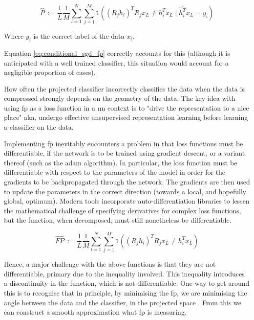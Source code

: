 \begin{equation}
\label{eq:conditional_sgd_fp}
\hat{P}\ := \frac{1}{L}\frac{1}{M}\sum_{l = 1}^N \sum_{j = 1}^M  \mathds{1}( (R_j h_i)^T R_jx_L \neq h_i^Tx_L \mid \hat{h_i^T}x_L = y_i )  
\end{equation}

Where $y_i$ is the correct label of the data $x_i$. 
\bigskip

Equation \ref{eq:conditional_sgd_fp} correctly accounts for this (although it is anticipated with a well trained classifier, this situation would account for a negligible proportion of cases). 
\bigskip

How often the projected classifier incorrectly classifies the data when the data is compressed strongly depends on the geometry of the data. The key idea with using \gls{fp} as a loss function in a \gls{nn} context is to "drive the representation to a nice place" aka, undergo effective unsupervised representation learning before learning a classifier on the data. 
\bigskip


Implementing  \gls{fp} inevitably encounters a problem in that loss functions must be differentiable, if the network is to be trained using gradient descent, or a variant thereof (such as the \gls{adam} algorithm). In particular, the loss function must be differentiable with respect to the parameters of the model in order for the gradients to be backpropagated through the network. The gradients are then used to update the parameters in the correct direction (towards a local, and hopefully global, optimum). Modern tools incorporate auto-differentiation libraries to lessen the mathematical challenge of specifying derivatives for complex loss functions, but the function, when decomposed, must still nonetheless be differentiable.
\bigskip

\begin{equation}
\hat{FP}\ := \frac{1}{L}\frac{1}{M}\sum_{l = 1}^N \sum_{j = 1}^M \mathds{1}((R_j h_i)^T R_jx_L \neq h_i^Tx_L)  
\label{eq:sgd_fp}
\end{equation}

Hence, a major challenge with the above functions is that they are not differentiable, primary due to the inequality involved. This inequality introduces a discontinuity in the function, which is not differentiable. One way to get around this is to recognise that in principle, by minimising the \gls{fp}, we are minimising the angle between the data and the classifier, in the projected space \cite[p.~3]{bob_rp_storage}. From this we can construct a smooth approximation what \gls{fp} is measuring.


